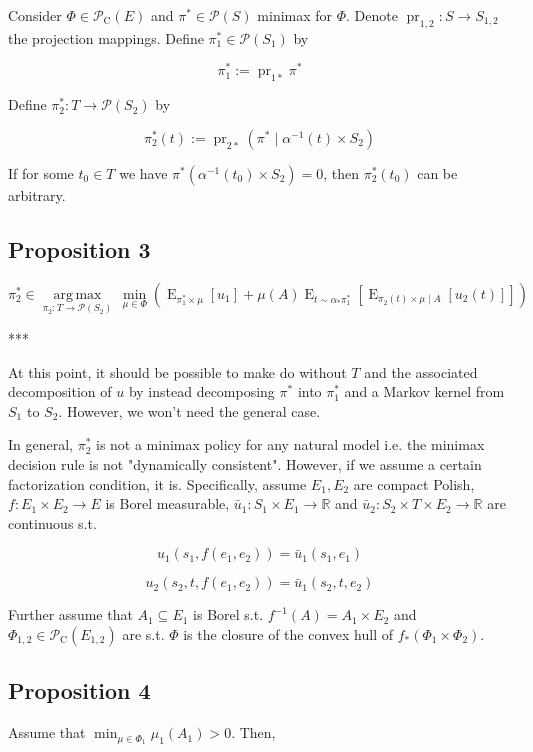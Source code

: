 \documentclass[a4paper]{article}
\DeclareMathOperator{\E}{E}
\DeclareMathOperator{\Prj}{pr}
\newcommand{\Argmax}[1]{\underset{#1}{\operatorname{arg\,max}}\,}
\newcommand{\Reals}{\mathbb{R}}
\newcommand{\Prob}{\mathcal{P}}
\newcommand{\CC}{\mathcal{P}_{\operatorname{C}}}
\begin{document}
Consider ${\Phi \in \CC(E)}$ and ${\pi^* \in \Prob(S)}$ minimax for ${\Phi}$. Denote ${\Prj_{1,2}: S \rightarrow S_{1,2}}$ the projection mappings. Define ${\pi_1^* \in \Prob(S_1)}$ by

$$\pi_1^* := \Prj_{1*}\pi^*$$

Define ${\pi_2^*: T \rightarrow \Prob(S_2)}$ by

$$\pi_2^*(t) := \Prj_{2*} (\pi^* \mid \alpha^{-1}(t) \times S_2)$$

If for some ${t_0 \in T}$ we have ${\pi^*(\alpha^{-1}(t_0) \times S_2)=0}$, then ${\pi^*_2(t_0)}$ can be arbitrary.

\subsection{Proposition 3}

$$\pi_2^* \in \Argmax{\pi_2: T \rightarrow \Prob(S_2)} \min_{\mu \in \Phi} (\E_{\pi_1^* \times \mu}[u_1] + \mu(A) \E_{t \sim \alpha_*\pi_1^*}[\E_{\pi_2(t) \times \mu \mid A}[u_2(t)]])$$

***

At this point, it should be possible to make do without ${T}$ and the associated decomposition of ${u}$ by instead decomposing ${\pi^*}$ into ${\pi_1^*}$ and a Markov kernel from ${S_1}$ to ${S_2}$. However, we won't need the general case.

In general, ${\pi_2^*}$ is not a minimax policy for any natural model i.e. the minimax decision rule is not "dynamically consistent". However, if we assume a certain factorization condition, it is. Specifically, assume ${E_1, E_2}$ are compact Polish, ${f: E_1 \times E_2 \rightarrow E}$ is Borel measurable, ${\bar{u}_1: S_1 \times E_1 \rightarrow \Reals}$ and ${\bar{u}_2: S_2 \times T \times E_2 \rightarrow \Reals}$ are continuous s.t. 

$${u_1(s_1,f(e_1,e_2))=\bar{u}_1(s_1,e_1)}$$

$${u_2(s_2,t,f(e_1,e_2))=\bar{u}_1(s_2,t,e_2)}$$

Further assume that ${A_1 \subseteq E_1}$ is Borel s.t. ${f^{-1}(A) = A_1 \times E_2}$ and ${\Phi_{1,2} \in \CC(E_{1,2})}$ are s.t. ${\Phi}$ is the closure of the convex hull of ${f_*(\Phi_1 \times \Phi_2)}$.

\subsection{Proposition 4}

Assume that ${\min_{\mu \in \Phi_1} \mu_1(A_1) > 0}$. Then,
\end{document}
